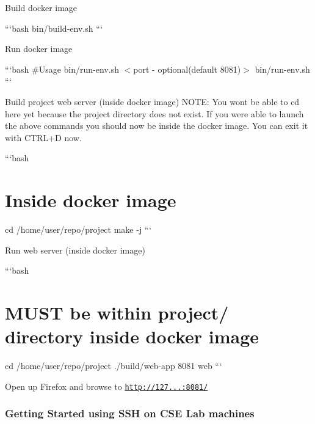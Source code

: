 \begin{DoxyEnumerate}
\item Build docker image

```bash bin/build-\/env.\+sh ```
\item Run docker image

```bash \#\+Usage bin/run-\/env.\+sh $<$port -\/ optional(default 8081)$>$ bin/run-\/env.\+sh ```
\item Build project web server (inside docker image) N\+O\+TE\+: You won\textquotesingle{}t be able to {\ttfamily cd} here yet because the project directory does not exist. If you were able to launch the above commands you should now be inside the docker image. You can exit it with C\+T\+R\+L+D now.

```bash \section*{Inside docker image}

cd /home/user/repo/project make -\/j ```
\item Run web server (inside docker image)

```bash \section*{M\+U\+ST be within project/ directory inside docker image}

cd /home/user/repo/project ./build/web-\/app 8081 web ```
\item Open up Firefox and browse to \href{http://127.0.0.1:8081/}{\tt http\+://127...\+:8081/}
\end{DoxyEnumerate}

\subsubsection*{Getting Started using S\+SH on C\+SE Lab machines}



